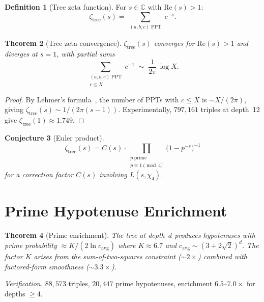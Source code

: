 \documentclass[12pt]{amsart}
\newtheorem{theorem}{Theorem}[section]
\newtheorem{conjecture}[theorem]{Conjecture}
\theoremstyle{definition}
\newtheorem{definition}[theorem]{Definition}
\theoremstyle{remark}
\begin{document}
\begin{definition}[Tree zeta function]\label{def:tree-zeta}
For $s \in \mathbb{C}$ with $\mathrm{Re}(s) > 1$:
\[
  \zeta_{\mathrm{tree}}(s) = \sum_{\substack{(a,b,c)\;\mathrm{PPT}}} c^{-s}.
\]
\end{definition}

\begin{theorem}[Tree zeta convergence]\label{thm:zeta}
$\zeta_{\mathrm{tree}}(s)$ converges for $\mathrm{Re}(s) > 1$ and diverges at
$s = 1$, with partial sums
\[
  \sum_{\substack{(a,b,c)\;\mathrm{PPT} \\ c \le X}} c^{-1}
  \;\sim\; \frac{1}{2\pi}\,\log X.
\]
\end{theorem}

\begin{proof}
By Lehmer's formula~\cite{Lehmer1900}, the number of PPTs with $c \le X$ is
$\sim X/(2\pi)$, giving $\zeta_{\mathrm{tree}}(s) \sim 1/(2\pi(s-1))$.
Experimentally, $797{,}161$ triples at depth~12 give
$\zeta_{\mathrm{tree}}(1) \approx 1.749$.
\end{proof}

\begin{conjecture}[Euler product]\label{conj:euler}
\[
  \zeta_{\mathrm{tree}}(s)
  = C(s) \cdot \prod_{\substack{p\;\mathrm{prime} \\ p \equiv 1 \pmod{4}}}
  \bigl(1 - p^{-s}\bigr)^{-1}
\]
for a correction factor $C(s)$ involving $L(s, \chi_4)$.
\end{conjecture}


\section{Prime Hypotenuse Enrichment}\label{sec:enrichment}

\begin{theorem}[Prime enrichment]\label{thm:prime-enrich}
The tree at depth~$d$ produces hypotenuses with prime probability
$\approx K/(2\ln c_{\mathrm{avg}})$ where $K \approx 6.7$ and
$c_{\mathrm{avg}} \sim (3+2\sqrt{2})^d$. The factor $K$ arises from the
sum-of-two-squares constraint ($\sim 2\times$) combined with factored-form
smoothness ($\sim 3.3\times$).
\end{theorem}

\noindent
\textit{Verification.} $88{,}573$ triples, $20{,}447$ prime hypotenuses,
enrichment $6.5$--$7.0\times$ for depths $\ge 4$.
\end{document}

